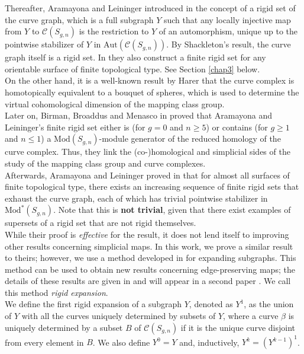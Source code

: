 \documentclass[twoside,11pt,a4paper]{article}
\newcommand*{\ccomp}[1]{\mathcal{C}(#1)}
\newcommand*{\Mod}[1]{\mathrm{Mod}(#1)}
\newcommand*{\EMod}[1]{\mathrm{Mod}^{*}(#1)}
\newcommand*{\Aut}[1]{\mathrm{Aut}(#1)}
\begin{document}
\indent Thereafter, Aramayona and Leininger introduced in \cite{Ara1} the concept of a rigid set of the curve graph, which is a full subgraph $Y$ such that any locally injective map from $Y$ to $\ccomp{S_{g,n}}$ is the restriction to $Y$ of an automorphism, unique up to the pointwise stabilizer of $Y$ in $\Aut{\ccomp{S_{g,n}}}$. By Shackleton's result, the curve graph itself is a rigid set. In \cite{Ara1} they also construct a finite rigid set for any orientable surface of finite topological type. See Section \ref{chap3} below.\\
\indent On the other hand, it is a well-known result by Harer \cite{Harer} that the curve complex is homotopically equivalent to a bouquet of spheres, which is used to determine the virtual cohomological dimension of the mapping class group.\\
\indent Later on, Birman, Broaddus and Menasco in \cite{Broaddus} proved that Aramayona and Leininger's finite rigid set either is (for $g = 0$ and $n \geq 5$) or contains (for $g \geq 1$ and $n \leq 1$) a $\Mod{S_{g,n}}$-module generator of the reduced homology of the curve complex. Thus, they link the (co-)homological and simplicial sides of the study of the mapping class group and curve complexes.\\
\indent Afterwards, Aramayona and Leininger proved in \cite{Ara2} that for almost all surfaces of finite topological type, there exists an increasing sequence of finite rigid sets that exhaust the curve graph, each of which has trivial pointwise stabilizer in $\EMod{S_{g,n}}$. Note that this is \textbf{not trivial}, given that there exist examples of supersets of a rigid set that are not rigid themselves.\\
\indent While their proof is \textit{effective} for the result, it does not lend itself to improving other results concerning simplicial maps. In this work, we prove a similar result to theirs; however, we use a method developed in \cite{Ara2} for expanding subgraphs. This method can be used to obtain new results concerning edge-preserving maps; the details of these results are given in \cite{Thesis} and will appear in a second paper \cite{JHH2}. We call this method \textit{rigid expansion}.\\
\indent We define the first rigid expansion of a subgraph $Y$, denoted as $Y^{1}$, as the union of $Y$ with all the curves uniquely determined by subsets of $Y$, where a curve $\beta$ is uniquely determined by a subset $B$ of $\ccomp{S_{g,n}}$ if it is the unique curve disjoint from every element in $B$. We also define $Y^{0} = Y$ and, inductively, $Y^{k} = (Y^{k-1})^{1}$.\\
\end{document}
